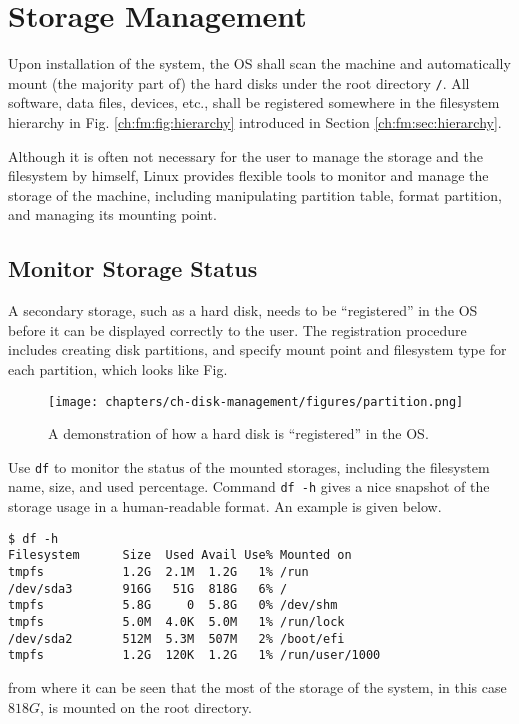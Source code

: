 \chapter{Storage Management}

Upon installation of the system, the OS shall scan the machine and automatically mount (the majority part of) the hard disks under the root directory \verb|/|. All software, data files, devices, etc., shall be registered somewhere in the filesystem hierarchy in Fig. \ref{ch:fm:fig:hierarchy} introduced in Section \ref{ch:fm:sec:hierarchy}.

Although it is often not necessary for the user to manage the storage and the filesystem by himself, Linux provides flexible tools to monitor and manage the storage of the machine, including manipulating partition table, format partition, and managing its mounting point.

\section{Monitor Storage Status}

A secondary storage, such as a hard disk, needs to be ``registered'' in the OS before it can be displayed correctly to the user. The registration procedure includes creating disk partitions, and specify mount point and filesystem type for each partition, which looks like Fig.

\begin{figure}[htbp]
	\centering
	\texttt{[image: chapters/ch-disk-management/figures/partition.png]}
	\caption{A demonstration of how a hard disk is ``registered'' in the OS.} \label{ch:dm:fig:partition}
\end{figure}

Use \verb|df| to monitor the status of the mounted storages, including the filesystem name, size, and used percentage. Command \verb|df -h| gives a nice snapshot of the storage usage in a human-readable format. An example is given below.
\begin{lstlisting}
$ df -h
Filesystem      Size  Used Avail Use% Mounted on
tmpfs           1.2G  2.1M  1.2G   1% /run
/dev/sda3       916G   51G  818G   6% /
tmpfs           5.8G     0  5.8G   0% /dev/shm
tmpfs           5.0M  4.0K  5.0M   1% /run/lock
/dev/sda2       512M  5.3M  507M   2% /boot/efi
tmpfs           1.2G  120K  1.2G   1% /run/user/1000
\end{lstlisting}
from where it can be seen that the most of the storage of the system, in this case $818G$, is mounted on the root directory.

